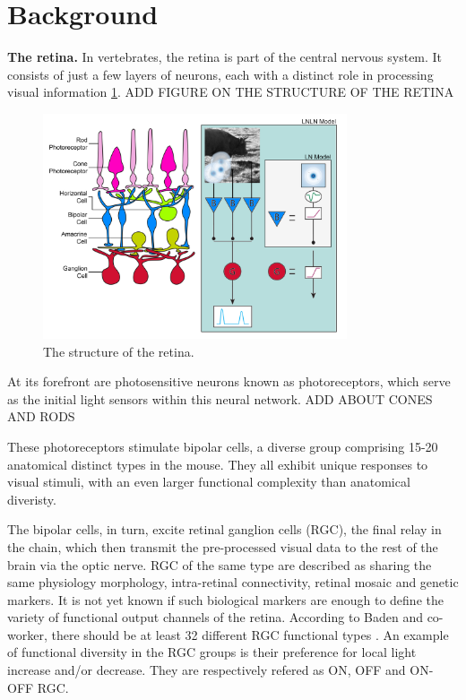 \section{Background}\label{sec:background}

\textbf{The retina.}
In vertebrates, the retina is part of the central nervous system. It consists
of just a few layers of neurons, each with a distinct role in processing visual
information \ref*{fig:retina_structure}. ADD FIGURE ON THE STRUCTURE OF THE RETINA

\begin{figure}[h]
    \centering
    \includegraphics[width=0.8\textwidth]{pics/RetinaAnatToFunction.png}
    \caption{The structure of the retina.}
    \label{fig:retina_structure}
\end{figure}



At its forefront are photosensitive neurons known as photoreceptors, which
serve as the initial light sensors within this neural network. ADD ABOUT CONES
AND RODS

These photoreceptors stimulate bipolar cells, a diverse group comprising 15-20
anatomical
distinct types in the mouse. They all exhibit unique
responses to visual stimuli, with an even larger functional complexity than
anatomical diveristy. %

The bipolar cells, in turn, excite retinal ganglion cells (RGC), the final
relay in the
chain, which then transmit the pre-processed visual data to the rest of the
brain
via the optic nerve. RGC of the same type are described as sharing the same
physiology morphology,
intra-retinal connectivity, retinal mosaic and genetic markers. It is not yet
known if such biological markers are enough to define the variety of functional
output channels of the retina. According to Baden and co-worker, there should
be at least 32 different RGC
functional types \citep*{baden_functional_2016}. An example of functional
diversity in the RGC groups is their preference for local light increase and/or
decrease. They are respectively refered as ON, OFF and ON-OFF RGC.


